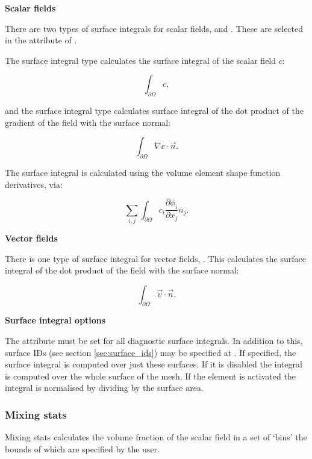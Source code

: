 \textbf{Scalar fields}

There are two types of surface integrals for scalar fields,  and
. These are selected in the  attribute of
.

The surface integral type  calculates the surface integral of the
scalar field $c$:

\begin{equation}
\int_{\partial \Omega} c,
\end{equation}

and the surface integral type  calculates surface integral
of the dot product of the gradient of the field with the surface normal:

\begin{equation}
\int_{\partial \Omega} \nabla c \cdot \vec{n}.
\end{equation}

The  surface integral is calculated using the volume
element shape function derivatives, via:

\begin{equation}
\sum_{i,j} \int_{\partial \Omega} {c_i \frac{\partial \phi_i}{\partial x_j} n_j}.
\end{equation}

\textbf{Vector fields}

There is one type of surface integral for vector fields, . This
calculates the surface integral of the dot product of the field with the surface
normal:

\begin{equation}
\int_{\partial \Omega} \vec{v} \cdot \vec{n}.
\end{equation}

\textbf{Surface integral options}

The  attribute must be set for all diagnostic surface integrals. In
addition to this, surface IDs (see section \ref{sec:surface_ids}) may be specified at
. If specified, the surface
integral is computed over just these surfaces. If it is disabled the integral is computed
over the whole surface of the
mesh. If the element  is activated
the integral is normalised by dividing by the surface area.

\subsubsection{Mixing stats}
\label{sec:stat_mixing_stats}
Mixing stats calculates the volume fraction of the scalar field in a set of `bins' the bounds of which are specified by the user. 

